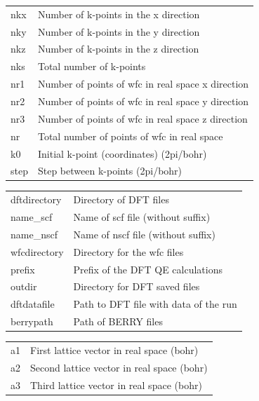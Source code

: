 \documentclass[a4paper,12pt]{report}
\begin{document}
\begin{appendices}
\begin{tabularx}{\textwidth}{Xl}
 nkx            & Number of k-points in the x direction \\
 nky            & Number of k-points in the y direction \\
 nkz            & Number of k-points in the z direction \\
 nks            & Total number of k-points \\

 nr1            & Number of points of wfc in real space x direction \\
 nr2            & Number of points of wfc in real space y direction \\
 nr3            & Number of points of wfc in real space z direction \\
 nr             & Total number of points of wfc in real space \\

 k0             & Initial k-point (coordinates) (2pi/bohr) \\
 step           & Step between k-points (2pi/bohr) \\
\end{tabularx}
\vspace{0.5cm}

\begin{tabularx}{\textwidth}{Xl}
 dftdirectory   & Directory of DFT files \\
 name\_scf       & Name of scf file (without suffix) \\
 name\_nscf      & Name of nscf file (without suffix) \\
 wfcdirectory   & Directory for the wfc files \\
 prefix         & Prefix of the DFT QE calculations \\
 outdir         & Directory for DFT saved files \\
 dftdatafile    & Path to DFT file with data of the run \\
 berrypath      & Path of BERRY files \\
\end{tabularx}
\vspace{0.5cm}

\begin{tabularx}{\textwidth}{Xl}
 a1             & First lattice vector in real space (bohr) \\
 a2             & Second lattice vector in real space (bohr) \\
 a3             & Third lattice vector in real space (bohr) \\


\end{tabularx}
\end{appendices}
\end{document}
